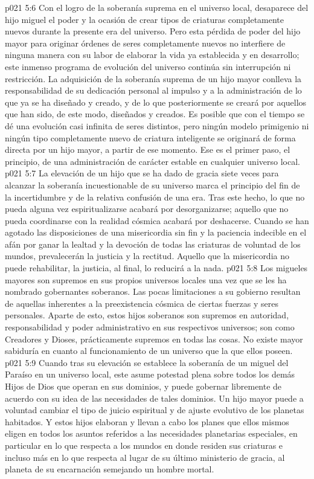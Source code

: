 \vs p021 5:6 \pc Con el logro de la soberanía suprema en el universo local, desaparece del hijo miguel el poder y la ocasión de crear tipos de criaturas completamente nuevos durante la presente era del universo. Pero esta pérdida de poder del hijo mayor para originar órdenes de seres completamente nuevos no interfiere de ninguna manera con su labor de elaborar la vida ya establecida y en desarrollo; este inmenso programa de evolución del universo continúa sin interrupción ni restricción. La adquisición de la soberanía suprema de un hijo mayor conlleva la responsabilidad de su dedicación personal al impulso y a la administración de lo que ya se ha diseñado y creado, y de lo que posteriormente se creará por aquellos que han sido, de este modo, diseñados y creados. Es posible que con el tiempo se dé una evolución casi infinita de seres distintos, pero ningún modelo primigenio ni ningún tipo completamente nuevo de criatura inteligente se originará de forma directa por un hijo mayor, a partir de ese momento. Ese es el primer paso, el principio, de una administración de carácter estable en cualquier universo local.
\vs p021 5:7 La elevación de un hijo que se ha dado de gracia siete veces para alcanzar la soberanía incuestionable de su universo marca el principio del fin de la incertidumbre y de la relativa confusión de una era. Tras este hecho, lo que no pueda alguna vez espiritualizarse acabará por desorganizarse; aquello que no pueda coordinarse con la realidad cósmica acabará por deshacerse. Cuando se han agotado las disposiciones de una misericordia sin fin y la paciencia indecible en el afán por ganar la lealtad y la devoción de todas las criaturas de voluntad de los mundos, prevalecerán la justicia y la rectitud. Aquello que la misericordia no puede rehabilitar, la justicia, al final, lo reducirá a la nada.
\vs p021 5:8 \pc Los migueles mayores son supremos en sus propios universos locales una vez que se les ha nombrado gobernantes soberanos. Las pocas limitaciones a su gobierno resultan de aquellas inherentes a la preexistencia cósmica de ciertas fuerzas y seres personales. Aparte de esto, estos hijos soberanos son supremos en autoridad, responsabilidad y poder administrativo en sus respectivos universos; son como Creadores y Dioses, prácticamente supremos en todas las cosas. No existe mayor sabiduría en cuanto al funcionamiento de un universo que la que ellos poseen.
\vs p021 5:9 Cuando tras su elevación se establece la soberanía de un miguel del Paraíso en un universo local, este asume potestad plena sobre todos los demás Hijos de Dios que operan en sus dominios, y puede gobernar libremente de acuerdo con su idea de las necesidades de tales dominios. Un hijo mayor puede a voluntad cambiar el tipo de juicio espiritual y de ajuste evolutivo de los planetas habitados. Y estos hijos elaboran y llevan a cabo los planes que ellos mismos eligen en todos los asuntos referidos a las necesidades planetarias especiales, en particular en lo que respecta a los mundos en donde residen sus criaturas e incluso más en lo que respecta al lugar de su último ministerio de gracia, al planeta de su encarnación semejando un hombre mortal.
